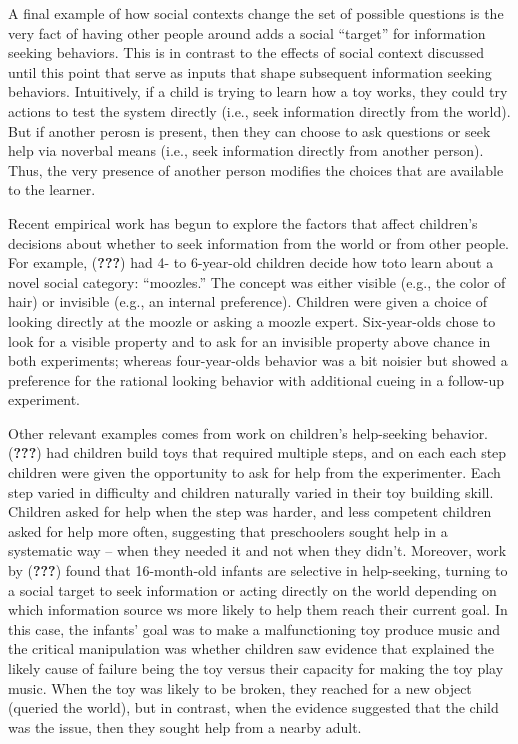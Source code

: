 \documentclass[english,man]{apa6}
\theoremstyle{definition}
\theoremstyle{definition}
\theoremstyle{definition}
\theoremstyle{remark}
\begin{document}
A final example of how social contexts change the set of possible
questions is the very fact of having other people around adds a social
\enquote{target} for information seeking behaviors. This is in contrast
to the effects of social context discussed until this point that serve
as inputs that shape subsequent information seeking behaviors.
Intuitively, if a child is trying to learn how a toy works, they could
try actions to test the system directly (i.e., seek information directly
from the world). But if another perosn is present, then they can choose
to ask questions or seek help via noverbal means (i.e., seek information
directly from another person). Thus, the very presence of another person
modifies the choices that are available to the learner.

Recent empirical work has begun to explore the factors that affect
children's decisions about whether to seek information from the world or
from other people. For example, ({\textbf{???}}) had 4- to 6-year-old
children decide how toto learn about a novel social category:
\enquote{moozles.} The concept was either visible (e.g., the color of
hair) or invisible (e.g., an internal preference). Children were given a
choice of looking directly at the moozle or asking a moozle expert.
Six-year-olds chose to look for a visible property and to ask for an
invisible property above chance in both experiments; whereas
four-year-olds behavior was a bit noisier but showed a preference for
the rational looking behavior with additional cueing in a follow-up
experiment.

Other relevant examples comes from work on children's help-seeking
behavior. ({\textbf{???}}) had children build toys that required
multiple steps, and on each each step children were given the
opportunity to ask for help from the experimenter. Each step varied in
difficulty and children naturally varied in their toy building skill.
Children asked for help when the step was harder, and less competent
children asked for help more often, suggesting that preschoolers sought
help in a systematic way -- when they needed it and not when they
didn't. Moreover, work by ({\textbf{???}}) found that 16-month-old
infants are selective in help-seeking, turning to a social target to
seek information or acting directly on the world depending on which
information source ws more likely to help them reach their current goal.
In this case, the infants' goal was to make a malfunctioning toy produce
music and the critical manipulation was whether children saw evidence
that explained the likely cause of failure being the toy versus their
capacity for making the toy play music. When the toy was likely to be
broken, they reached for a new object (queried the world), but in
contrast, when the evidence suggested that the child was the issue, then
they sought help from a nearby adult.
\end{document}
